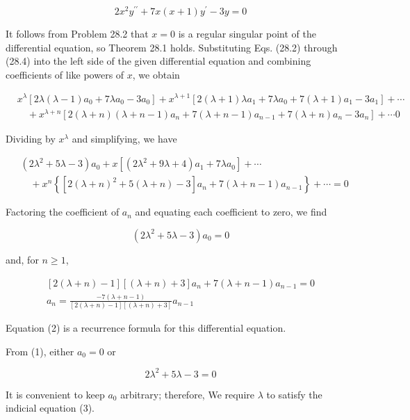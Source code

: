 \documentclass[10pt]{article}
\begin{document}
$$
2 x^{2} y^{\prime \prime}+7 x(x+1) y^{\prime}-3 y=0
$$

It follows from Problem 28.2 that $x=0$ is a regular singular point of the differential equation, so Theorem 28.1 holds. Substituting Eqs. (28.2) through (28.4) into the left side of the given differential equation and combining coefficients of like powers of $x$, we obtain

$$
\begin{aligned}
& x^{\lambda}\left[2 \lambda(\lambda-1) a_{0}+7 \lambda a_{0}-3 a_{0}\right]+x^{\lambda+1}\left[2(\lambda+1) \lambda a_{1}+7 \lambda a_{0}+7(\lambda+1) a_{1}-3 a_{1}\right]+\cdots \\
& \quad+x^{\lambda+n}\left[2(\lambda+n)(\lambda+n-1) a_{n}+7(\lambda+n-1) a_{n-1}+7(\lambda+n) a_{n}-3 a_{n}\right]+\cdots 0
\end{aligned}
$$

Dividing by $x^{\lambda}$ and simplifying, we have

$$
\begin{aligned}
& \left(2 \lambda^{2}+5 \lambda-3\right) a_{0}+x\left[\left(2 \lambda^{2}+9 \lambda+4\right) a_{1}+7 \lambda a_{0}\right]+\cdots \\
& \quad+x^{n}\left\{\left[2(\lambda+n)^{2}+5(\lambda+n)-3\right] a_{n}+7(\lambda+n-1) a_{n-1}\right\}+\cdots=0
\end{aligned}
$$

Factoring the coefficient of $a_{n}$ and equating each coefficient to zero, we find


\begin{equation*}
\left(2 \lambda^{2}+5 \lambda-3\right) a_{0}=0 \tag{1}
\end{equation*}


and, for $n \geq 1$,


\begin{gather*}
{[2(\lambda+n)-1][(\lambda+n)+3] a_{n}+7(\lambda+n-1) a_{n-1}=0} \\
a_{n}=\frac{-7(\lambda+n-1)}{[2(\lambda+n)-1][(\lambda+n)+3]} a_{n-1} \tag{2}
\end{gather*}


Equation (2) is a recurrence formula for this differential equation.

From (1), either $a_{0}=0$ or


\begin{equation*}
2 \lambda^{2}+5 \lambda-3=0 \tag{3}
\end{equation*}


It is convenient to keep $a_{0}$ arbitrary; therefore, We require $\lambda$ to satisfy the indicial equation (3).
\end{document}
